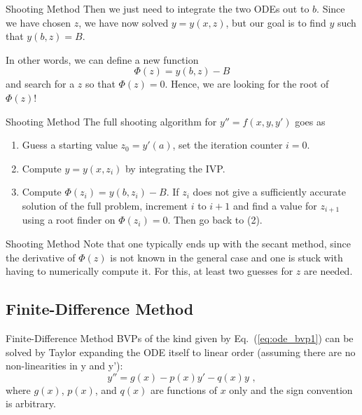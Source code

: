 \documentclass[11pt]{beamer}
\begin{document}
\begin{frame}[fragile]{Shooting Method}
Then we just need to integrate
the two ODEs out to $b$. Since we have chosen $z$, we have now solved
$y=y(x,z)$, but our goal is to find $y$ such that $y(b,z) = B$.

In other words, we can define a new function 
\begin{equation}
\Phi(z) = y(b,z) - B
\end{equation}
and search for a $z$ so that $\Phi(z) = 0$. Hence, we are looking
for the root of $\Phi(z)$!
\end{frame}

\begin{frame}[fragile]{Shooting Method}
The full shooting algorithm for $y'' = f(x,y,y')$ goes as

\begin{enumerate}
\item Guess a starting value $z_0 = y'(a)$, set the iteration counter 
$i = 0$.
\item Compute $y = y(x,z_i)$ by integrating the IVP.
\item Compute $\Phi(z_i) = y(b,z_i) - B$. If $z_i$ does not
      give a sufficiently accurate solution of the full problem,
      increment $i$ to $i+1$ and find  a value for
      $z_{i+1}$ using a root finder on $\Phi(z_i) = 0$. 
      Then go back to (2).
\end{enumerate}
\end{frame}

\begin{frame}[fragile]{Shooting Method}
Note that one typically ends up with the secant method, since the
derivative of $\Phi(z)$ is not known in the general case and one is
stuck with having to numerically compute it. For this, at least two
guesses for $z$ are needed.
\end{frame}

\subsection{Finite-Difference Method}
\begin{frame}[fragile]{Finite-Difference Method}
BVPs of the kind given by Eq.~(\ref{eq:ode_bvp1}) can be solved
by Taylor expanding the ODE itself to linear
order (assuming there are no non-linearities in y and y'):
\begin{equation}
y'' = g(x) - p(x)y' - q(x) y\,\,,
\label{eq:ode_bvp2}
\end{equation}
where $g(x)$, $p(x)$, and $q(x)$ are functions of $x$ only and the sign
convention is arbitrary.
\end{frame}
\end{document}
